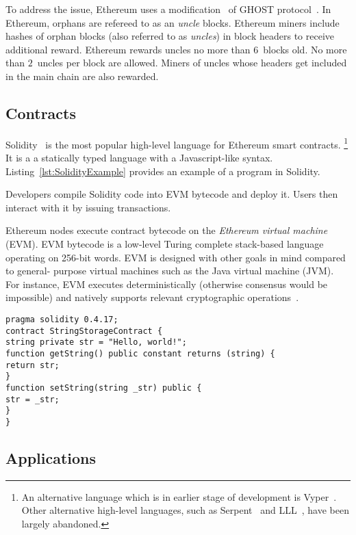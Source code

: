 To address the issue, Ethereum uses a modification~\cite{Lewenberg2015} of GHOST protocol~\cite{Sompolinsky2013, EthdocsMining}.
In Ethereum, orphans are refereed to as an \textit{uncle} blocks.
Ethereum miners include hashes of orphan blocks (also referred to as \textit{uncles}) in block headers to receive additional reward.
Ethereum rewards uncles no more than $6$~blocks old.
No more than $2$~uncles per block are allowed.
Miners of uncles whose headers get included in the main chain are also rewarded.


\subsection{Contracts}

Solidity~\cite{Solidity17} is the most popular high-level language for Ethereum smart contracts.
\footnote{An alternative language which is in earlier stage of development is Vyper~\cite{Vyper}. Other alternative high-level languages, such as Serpent~\cite{SerpentGithub} and LLL~\cite{Ellison2017}, have been largely abandoned.}
It is a a statically typed language with a Javascript-like syntax.
Listing~\ref{lst:SolidityExample} provides an example of a program in Solidity.

Developers compile Solidity code into EVM bytecode and deploy it.
Users then interact with it by issuing transactions.

Ethereum nodes execute contract bytecode on the \textit{Ethereum virtual machine} (EVM).
EVM bytecode is a low-level Turing complete stack-based language operating on 256-bit words.
EVM is designed with other goals in mind compared to general- purpose virtual machines such as the Java virtual machine (JVM).
For instance, EVM executes deterministically (otherwise consensus would be impossible) and natively supports relevant cryptographic operations~\cite{Buterin2017}.

\begin{lstlisting}[language=Solidity, label={lst:SolidityExample}, caption=A simple contract in Solidity]
pragma solidity 0.4.17;
contract StringStorageContract {
string private str = "Hello, world!";
function getString() public constant returns (string) {
return str;
}
function setString(string _str) public {
str = _str;
}
}
\end{lstlisting}


\subsection{Applications}

